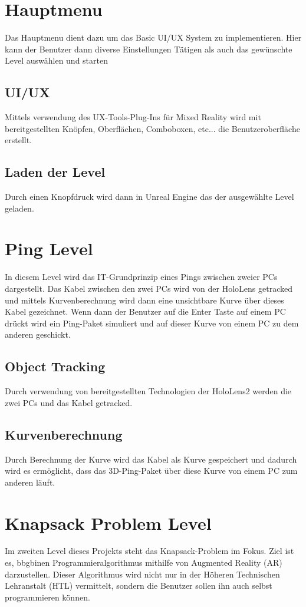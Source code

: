 \section{Hauptmenu}
Das Hauptmenu dient dazu um das Basic UI/UX System zu implementieren.
Hier kann der Benutzer dann diverse Einstellungen Tätigen als auch
das gewünschte Level auswählen und starten

\subsection{UI/UX}
Mittels verwendung des UX-Tools-Plug-Ins für Mixed Reality wird
mit bereitgestellten Knöpfen, Oberflächen, Comboboxen, etc...
die Benutzeroberfläche erstellt.

\subsection{Laden der Level}
Durch einen Knopfdruck wird dann in Unreal Engine das der ausgewählte
Level geladen.

\section{Ping Level}
In diesem Level wird das IT-Grundprinzip eines Pings zwischen zweier
PCs dargestellt. Das Kabel zwischen den zwei PCs wird von der
HoloLens getracked und mittels Kurvenberechnung wird dann eine
unsichtbare Kurve über dieses Kabel gezeichnet. Wenn dann der Benutzer
auf die Enter Taste auf einem PC drückt wird ein Ping-Paket simuliert
und auf dieser Kurve von einem PC zu dem anderen geschickt.

\subsection{Object Tracking}
Durch verwendung von bereitgestellten Technologien der HoloLens2
werden die zwei PCs und das Kabel getracked.

\subsection{Kurvenberechnung}
Durch Berechnung der Kurve wird das Kabel als Kurve gespeichert
und dadurch wird es ermöglicht, dass das 3D-Ping-Paket über diese
Kurve von einem PC zum anderen läuft.

\section{Knapsack Problem Level}
Im zweiten Level dieses Projekts steht das Knapsack-Problem im Fokus.
Ziel ist es, bbgbinen Programmieralgorithmus mithilfe von Augmented Reality
(AR) darzustellen. Dieser Algorithmus wird nicht nur in der Höheren
Technischen Lehranstalt (HTL) vermittelt, sondern die Benutzer sollen
ihn auch selbst programmieren können.

